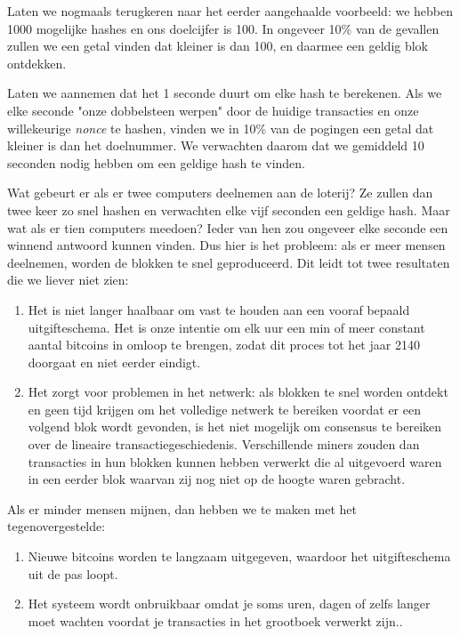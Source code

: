 Laten we nogmaals terugkeren naar het eerder aangehaalde voorbeeld: we hebben 1000 mogelijke hashes en ons doelcijfer is 100. In ongeveer 10\% van de gevallen zullen we een getal vinden dat kleiner is dan 100, en daarmee een geldig blok ontdekken.

Laten we aannemen dat het 1 seconde duurt om elke hash te berekenen. Als we elke seconde "onze dobbelsteen werpen" door de huidige transacties en onze willekeurige \textit{nonce} te hashen, vinden we in 10\% van de pogingen een getal dat kleiner is dan het doelnummer. We verwachten daarom dat we gemiddeld 10 seconden nodig hebben om een geldige hash te vinden.

Wat gebeurt er als er twee computers deelnemen aan de loterij? Ze zullen dan twee keer zo snel hashen en verwachten elke vijf seconden een geldige hash. Maar wat als er tien computers meedoen? Ieder van hen zou ongeveer elke seconde een winnend antwoord kunnen vinden.
\clearpage
Dus hier is het probleem: als er meer mensen deelnemen, worden de blokken te snel geproduceerd. Dit leidt tot twee resultaten die we liever niet zien:

\begin{enumerate}
    \item Het is niet langer haalbaar om vast te houden aan een vooraf bepaald uitgifteschema. Het is onze intentie om elk uur een min of meer constant aantal bitcoins in omloop te brengen, zodat dit proces tot het jaar 2140 doorgaat en niet eerder eindigt.
    \item Het zorgt voor problemen in het netwerk: als blokken te snel worden ontdekt en geen tijd krijgen om het volledige netwerk te bereiken voordat er een volgend blok wordt gevonden, is het niet mogelijk om consensus te bereiken over de lineaire transactiegeschiedenis. Verschillende miners zouden dan transacties in hun blokken kunnen hebben verwerkt die al uitgevoerd waren in een eerder blok waarvan zij nog niet op de hoogte waren gebracht.
\end{enumerate}

Als er minder mensen mijnen, dan hebben we te maken met het tegenovergestelde:

\begin{enumerate}
    \item  	Nieuwe bitcoins worden te langzaam uitgegeven, waardoor het uitgifteschema uit de pas loopt.
    \item Het systeem wordt onbruikbaar omdat je soms uren, dagen of zelfs langer moet wachten voordat je transacties in het grootboek verwerkt zijn..
\end{enumerate}

